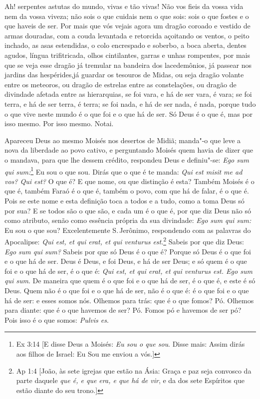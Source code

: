 Ah! serpentes astutas do mundo, vivas e tão vivas! Não vos fieis
da vossa vida nem da vossa viveza; não sois o que cuidais nem o que
sois: sois o que fostes e o que haveis de ser. Por mais que vós vejais
agora um dragão coroado e vestido de armas douradas, com a couda
levantada e retorcida açoitando os ventos, o peito inchado, as asas
estendidas, o colo encrespado e soberbo, a boca aberta, dentes
agudos, língua trifitricada, olhos cintilantes, garras e unhas
rompentes, por mais que se veja esse dragão já tremular na bandeira dos
lacedemônios, já passear nos jardins das hespérides,já guardar os
tesouros de Midas, ou seja dragão volante entre os meteoros, ou dragão
de estrelas entre as constelações, ou dragão de divindade afetada entre
as hierarquias, se foi vara, e há de ser vara, é vara; se foi terra, e
há de ser terra, é terra; se foi nada, e há de ser nada, é nada, porque
tudo o que vive neste mundo é o que foi e o que há de ser. Só Deus é o
que é, mas por isso mesmo. Por isso mesmo. Notai.

Apareceu Deus ao mesmo Moisés nos desertos de Midiã; manda"-o que leve a nova da liberdade ao povo cativo, e perguntando
Moisés quem havia de dizer que o mandava, para que lhe dessem crédito,
respondeu Deus e definiu"-se: \emph{Ego sum qui sum:}\footnote{Ex 3:14 [E disse Deus a Moisés: \emph{Eu sou o que sou}. Disse mais: Assim dirás aos filhos de Israel: Eu
Sou me enviou a vós.]} Eu sou o que sou.
Dirás que o que é te manda: \emph{Qui est misit me ad vos?
Qui est?} O que é? E que nome, ou que distinção é esta? Também Moisés é
o que é, também Faraó é o que é, também o povo, com que há de falar, é o
que é. Pois se este nome e esta definição toca a todos e a tudo, como a
toma Deus só por sua? E se todos são o que são, e cada um é o que é, por
que diz Deus não só como atributo, senão como essência própria da sua
divindade: \emph{Ego sum qui sum:} Eu sou o que sou? Excelentemente S.\,Jerônimo, respondendo com as palavras do Apocalipse: \emph{Qui est, et
qui erat, et qui venturus est}.\footnote{Ap 1:4 [João, às sete igrejas que estão na Ásia: Graça e paz seja convosco da parte daquele \emph{que é, e que era, e que há de vir}, e da dos sete Espíritos que estão diante do seu trono.]} Sabeis por que diz Deus: \emph{Ego sum
qui sum?} Sabeis por que só Deus é o que é? Porque só Deus é o que foi e
o que há de ser. Deus é Deus, e foi Deus, e há de ser Deus; e só quem é
o que foi e o que há de ser, é o que é: \emph{Qui est, et qui erat, et
qui venturus est. Ego sum qui sum}. De maneira que quem é o que foi e o
que há de ser, é o que é, e este é só Deus. Quem não é o que foi e o que
há de ser, não é o que é: é o que foi e o que há de ser: e esses somos
nós. Olhemos para trás: que é o que fomos? Pó. Olhemos para diante: que
é o que havemos de ser? Pó. Fomos pó e havemos de ser pó? Pois isso é o
que somos: \emph{Pulvis es}.


